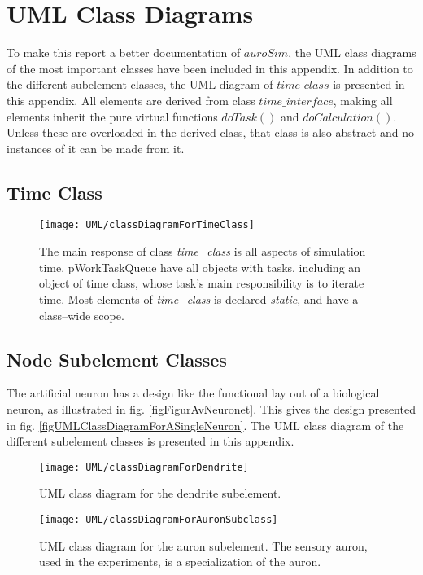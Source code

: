 \chapter{UML Class Diagrams}
	To make this report a better documentation of $auroSim$, the UML class diagrams of the most important classes have been included in this appendix.
	In addition to the different subelement classes, the UML diagram of $time\_class$ is presented in this appendix.
	All elements are derived from class $time\_interface$, making all elements inherit the pure virtual functions $doTask()$ and $doCalculation()$.
	Unless these are overloaded in the derived class, that class is also abstract and no instances of it can be made from it.
	
	
\newpage
\section{Time Class}
		\begin{figure}[hbt!p]
			\centerline{ \texttt{[image: UML/classDiagramForTimeClass]} }
			\caption[UML class diagram for \emph{time\_class}]{
				The main response of class \emph{time\_class} is all aspects of simulation time. 
				pWorkTaskQueue have all objects with tasks, including an object of time class, whose task's main responsibility is to iterate time.
				Most elements of \emph{time\_class} is declared \emph{static}, and have a class--wide scope.
					}
		\end{figure}

\newpage
\section{Node Subelement Classes}
\label{appendixUMLofAllNodeSubelementClasses}
	The artificial neuron has a design like the functional lay out of a biological neuron, as illustrated in fig. \ref{figFigurAvNeuronet}.
	This gives the design presented in fig. \ref{figUMLClassDiagramForASingleNeuron}.
	The UML class diagram of the different subelement classes is presented in this appendix.

		\begin{figure}[hbt!p]
			\centerline{ \texttt{[image: UML/classDiagramForDendrite]} }
			\caption[UML class diagram for dendrite subelement]{UML class diagram for the dendrite subelement.}
		\end{figure}

		\begin{figure}[hbt!p]
			\centerline{ \texttt{[image: UML/classDiagramForAuronSubclass]} }
			\caption[UML class diagram for auron subelement]{UML class diagram for the auron subelement. The sensory auron, used in the experiments, is a specialization of the auron.}
		\end{figure}

